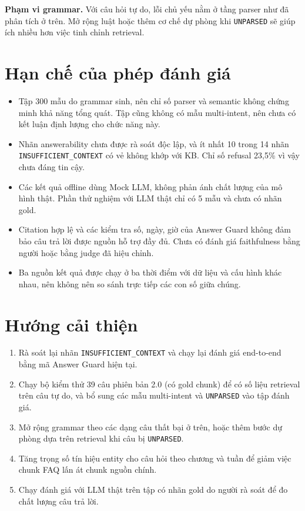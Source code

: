 \textbf{Phạm vi grammar.} Với câu hỏi tự do, lỗi chủ yếu nằm ở tầng parser như đã phân tích ở trên. Mở rộng luật hoặc thêm cơ chế dự phòng khi \texttt{UNPARSED} sẽ giúp ích nhiều hơn việc tinh chỉnh retrieval.

\section{Hạn chế của phép đánh giá}

\begin{itemize}
  \item Tập 300 mẫu do grammar sinh, nên chỉ số parser và semantic không chứng minh khả năng tổng quát. Tập cũng không có mẫu multi-intent, nên chưa có kết luận định lượng cho chức năng này.
  \item Nhãn answerability chưa được rà soát độc lập, và ít nhất 10 trong 14 nhãn \texttt{INSUFFICIENT\_CONTEXT} có vẻ không khớp với KB. Chỉ số refusal 23,5\% vì vậy chưa đáng tin cậy.
  \item Các kết quả offline dùng Mock LLM, không phản ánh chất lượng của mô hình thật. Phần thử nghiệm với LLM thật chỉ có 5 mẫu và chưa có nhãn gold.
  \item Citation hợp lệ và các kiểm tra số, ngày, giờ của Answer Guard không đảm bảo câu trả lời được nguồn hỗ trợ đầy đủ. Chưa có đánh giá faithfulness bằng người hoặc bằng judge đã hiệu chỉnh.
  \item Ba nguồn kết quả được chạy ở ba thời điểm với dữ liệu và cấu hình khác nhau, nên không nên so sánh trực tiếp các con số giữa chúng.
\end{itemize}

\section{Hướng cải thiện}

\begin{enumerate}
  \item Rà soát lại nhãn \texttt{INSUFFICIENT\_CONTEXT} và chạy lại đánh giá end-to-end bằng mã Answer Guard hiện tại.
  \item Chạy bộ kiểm thử 39 câu phiên bản 2.0 (có gold chunk) để có số liệu retrieval trên câu tự do, và bổ sung các mẫu multi-intent và \texttt{UNPARSED} vào tập đánh giá.
  \item Mở rộng grammar theo các dạng câu thất bại ở trên, hoặc thêm bước dự phòng dựa trên retrieval khi câu bị \texttt{UNPARSED}.
  \item Tăng trọng số tín hiệu entity cho câu hỏi theo chương và tuần để giảm việc chunk FAQ lấn át chunk nguồn chính.
  \item Chạy đánh giá với LLM thật trên tập có nhãn gold do người rà soát để đo chất lượng câu trả lời.
\end{enumerate}
